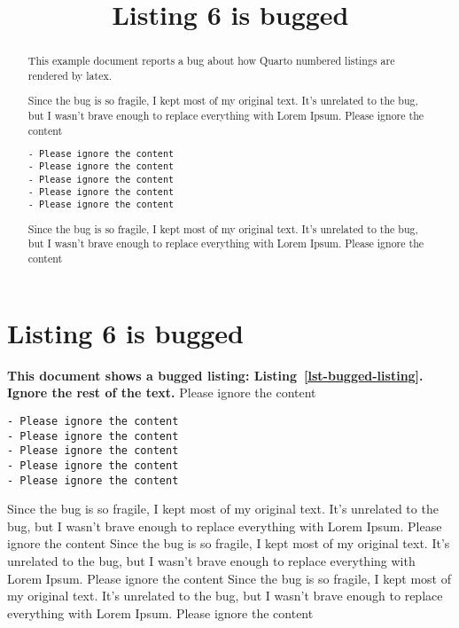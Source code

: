 \documentclass[
  letterpaper,
  DIV=11,
  numbers=noendperiod]{scrartcl}
\title{Listing 6 is bugged}
\author{}
\date{}
\theoremstyle{plain}
\theoremstyle{remark}
\begin{document}
\maketitle
\begin{abstract}
This example document reports a bug about how Quarto numbered listings
are rendered by latex.

Since the bug is so fragile, I kept most of my original text. It's
unrelated to the bug, but I wasn't brave enough to replace everything
with Lorem Ipsum. Please ignore the content

\begin{verbatim}
- Please ignore the content
- Please ignore the content
- Please ignore the content
- Please ignore the content
- Please ignore the content
\end{verbatim}

Since the bug is so fragile, I kept most of my original text. It's
unrelated to the bug, but I wasn't brave enough to replace everything
with Lorem Ipsum. Please ignore the content
\end{abstract}
\ifdefined\Shaded\renewenvironment{Shaded}{\begin{tcolorbox}[enhanced, interior hidden, breakable, borderline west={3pt}{0pt}{shadecolor}, boxrule=0pt, sharp corners, frame hidden]}{\end{tcolorbox}}\fi

\hypertarget{listing-6-is-bugged}{%
\section{Listing 6 is bugged}\label{listing-6-is-bugged}}

\textbf{This document shows a bugged listing:
Listing~\ref{lst-bugged-listing}. Ignore the rest of the text.} Please
ignore the content

\begin{verbatim}
- Please ignore the content
- Please ignore the content
- Please ignore the content
- Please ignore the content
- Please ignore the content
\end{verbatim}

Since the bug is so fragile, I kept most of my original text. It's
unrelated to the bug, but I wasn't brave enough to replace everything
with Lorem Ipsum. Please ignore the content Since the bug is so fragile,
I kept most of my original text. It's unrelated to the bug, but I wasn't
brave enough to replace everything with Lorem Ipsum. Please ignore the
content Since the bug is so fragile, I kept most of my original text.
It's unrelated to the bug, but I wasn't brave enough to replace
everything with Lorem Ipsum. Please ignore the content
\end{document}
